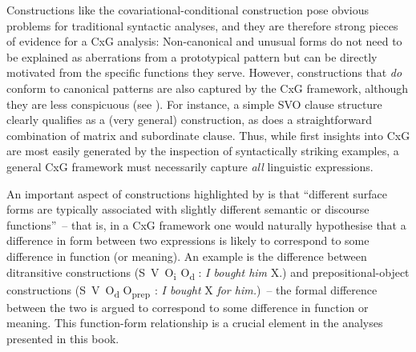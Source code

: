 \begin{sloppypar}
Constructions like the covariational-conditional construction pose obvious problems for traditional syntactic analyses, and they are therefore strong pieces of evidence for a CxG analysis: Non-canonical and unusual forms do not need to be explained as aberrations from a prototypical pattern but can be directly motivated from the specific functions they serve. However, constructions that \textit{do} conform to canonical patterns are also captured by the CxG framework, although they are less conspicuous (see ). For instance, a simple SVO clause structure clearly qualifies as a (very general) construction, as does a straightforward combination of matrix and subordinate clause. Thus, while first insights into CxG are most easily generated by the inspection of syntactically striking examples, a general CxG framework must necessarily capture \textit{all} linguistic expressions.
\end{sloppypar}

An important aspect of constructions highlighted by \citet[221]{Goldberg2003} is that “different surface forms are typically associated with slightly different semantic or discourse functions”~– that is, in a CxG framework one would naturally hypothesise that a difference in form between two expressions is likely to correspond to some difference in function (or meaning). An example \citep[221]{Goldberg2003} is the difference between ditransitive constructions (S~V~O\textsubscript{i~}O\textsubscript{d} : \textit{I bought him} X.) and prepositional-object constructions (S~V~O\textsubscript{d} O\textsubscript{prep~}: \textit{I bought} X \textit{for him.})~– the formal difference between the two is argued to correspond to some difference in function or meaning. This function-form relationship is a crucial element in the analyses presented in this book.

